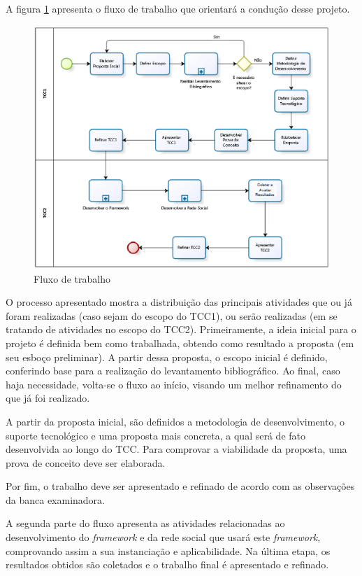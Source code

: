 A figura \ref{processo tcc} apresenta o fluxo de trabalho que orientará a condução desse projeto.

\newpage

\begin{figure}[h]
	\centering
	\includegraphics[scale=0.6]{figuras/capitulo4/processo_tcc.eps}
	\caption{Fluxo de trabalho}
	\label{processo tcc}
\end{figure}

O processo apresentado mostra a distribuição das principais atividades que ou já foram realizadas (caso sejam do escopo do TCC1), ou serão realizadas (em se tratando de atividades no escopo do TCC2). Primeiramente, a ideia inicial para o projeto é definida bem como trabalhada, obtendo como resultado a proposta (em seu esboço preliminar). A partir dessa proposta, o escopo inicial é definido, conferindo base para a realização do levantamento bibliográfico. Ao final, caso haja necessidade, volta-se o fluxo ao início, visando um melhor refinamento do que já foi realizado.

A partir da proposta inicial, são definidos a metodologia de desenvolvimento, o suporte tecnológico e uma proposta mais concreta, a qual será de fato desenvolvida ao longo do TCC. Para comprovar a viabilidade da proposta, uma prova de conceito deve ser elaborada.

Por fim, o trabalho deve ser apresentado e refinado de acordo com as observações da banca examinadora.

A segunda parte do fluxo apresenta as atividades relacionadas ao desenvolvimento do \textit{framework} e da rede social que usará este \textit{framework}, comprovando assim a sua instanciação e aplicabilidade. Na última etapa, os resultados obtidos são coletados e o trabalho final é apresentado e refinado.

